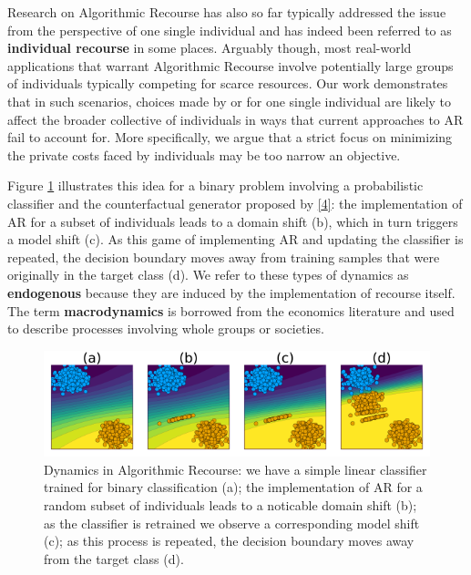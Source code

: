 \documentclass[conference,final,]{IEEEtran}
\begin{document}
Research on Algorithmic Recourse has also so far typically addressed the issue from the perspective of one single individual and has indeed been referred to as \textbf{individual recourse} in some places. Arguably though, most real-world applications that warrant Algorithmic Recourse involve potentially large groups of individuals typically competing for scarce resources. Our work demonstrates that in such scenarios, choices made by or for one single individual are likely to affect the broader collective of individuals in ways that current approaches to AR fail to account for. More specifically, we argue that a strict focus on minimizing the private costs faced by individuals may be too narrow an objective.

Figure \ref{fig:poc} illustrates this idea for a binary problem involving a probabilistic classifier and the counterfactual generator proposed by \protect\hyperlink{ref-wachter2017counterfactual}{{[}4{]}}: the implementation of AR for a subset of individuals leads to a domain shift (b), which in turn triggers a model shift (c). As this game of implementing AR and updating the classifier is repeated, the decision boundary moves away from training samples that were originally in the target class (d). We refer to these types of dynamics as \textbf{endogenous} because they are induced by the implementation of recourse itself. The term \textbf{macrodynamics} is borrowed from the economics literature and used to describe processes involving whole groups or societies.

\begin{figure}

{\centering \includegraphics[width=0.9\linewidth]{www/poc} 

}

\caption{Dynamics in Algorithmic Recourse: we have a simple linear classifier trained for binary classification (a); the implementation of AR for a random subset of individuals leads to a noticable domain shift (b); as the classifier is retrained we observe a corresponding model shift (c); as this process is repeated, the decision boundary moves away from the target class (d).}\label{fig:poc}
\end{figure}
\end{document}
